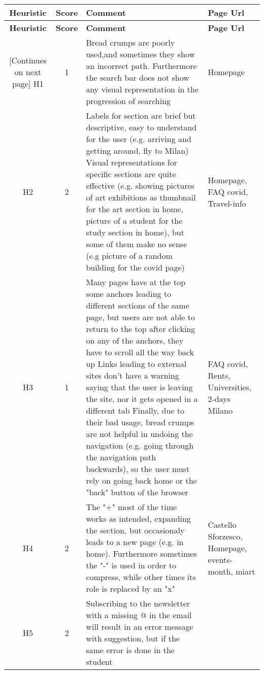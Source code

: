 \begin{tabularx}{\linewidth}{c c X p{3cm}}
    \textbf{Heuristic} & \textbf{Score} & \textbf{Comment} & \textbf{Page Url}
    \\ \midrule
    \endfirsthead
    \toprule
    \textbf{Heuristic} & \textbf{Score} & \textbf{Comment} & \textbf{Page Url}
    \\ \midrule
    \endhead
    \midrule
    \footnotesize [Continues on next page]
    \endfoot
    \bottomrule
    \endlastfoot
    H1 & 1 & Bread crumps are poorly used,and sometimes they show an incorrect path. Furthermore the search bar does not show any visual representation in the progression of searching & Homepage\\ \midrule
    H2 & 2 & Labels for section are brief but
    descriptive, easy to understand
    for the user (e.g. arriving and
    getting around, fly to Milan)
    Visual representations for specific
    sections are quite effective (e.g.
    showing pictures of art exhibitions
    as thumbnail for the art section in
    home, picture of a student for
    the study section in home), but
    some of them make no sense
    (e.g picture of a random
    building for the covid page) & Homepage, FAQ covid, Travel-info \\ \midrule
    H3 & 1 & Many pages have at the top
    some anchors leading to different
    sections of the same page,
    but users are not able to return to
    the top after clicking on any of the
    anchors, they have to scroll
    all the way back up
    Links leading to external sites
    don't have a warning saying that the
    user is leaving the site, nor it gets
    opened in a different tab
    Finally, due to their bad usage, bread
    crumps are not helpful in undoing the
    navigation (e.g. going through the
    navigation path backwards), so the user
    must rely on going back home or the
    "back" button of the browser & FAQ covid, Rents, Universities, 2-days Milano\\ \midrule
    H4 & 2 & The "+" most of the time works as intended,
    expanding the section, but
    occasionaly leads to a new page
    (e.g. in home). Furthermore sometimes
    the "-" is used in order to compress,
    while other times its role is replaced by
    an "x" & Castello Sforzesco, Homepage, events-month, miart\\ \midrule
    H5 & 2 & Subscribing
    to the newsletter with a
    missing @ in the email will result
    in an error message with suggestion,
    but if the same error is done in the student

\end{tabularx}
